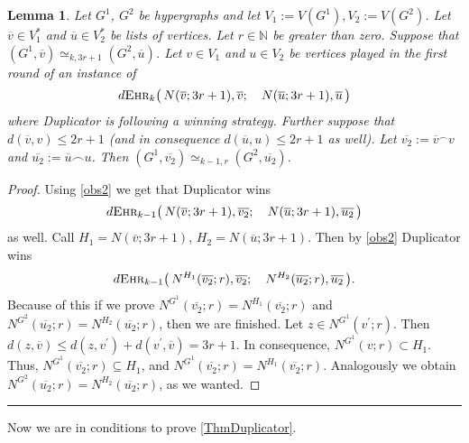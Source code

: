 \documentclass[12pt,notitlepage,a4paper]{article}
\newtheorem{lemma}{Lemma}[section]
\theoremstyle{definition}
\newcommand{\N}{\mathbb{N}}
\newcommand{\ehr}{\textsc{Ehr}}
\begin{document}
\begin{lemma} \label{lemm:Duplicator}
	Let $G^1$, $G^2$ be hypergraphs and let $V_1:=V(G^1),
	V_2:=V(G^2)$. Let $\overline{v}\in V_1^*$ and
	$\overline{u} \in V_2^*$ be lists of vertices. Let
	$r\in \N$ be greater than zero. Suppose that
	$(G^1,\overline{v})\simeq_{k,3r+1} (G^2,\overline{u})$.
	Let $v \in V_1$ and $u\in V_2$
	be vertices played in the first round of an instance of 
	\[
	d\ehr_k\big(\, N(\overline{v};3r+1),
	\overline{v}; \quad N(\overline{u};3r+1),\overline{u}\, \big)
	\]
	where Duplicator is following a winning strategy. Further suppose
	that $d(\overline{v},v)\leq 2r+1$ (and in consequence
	$d(\overline{u},u)\leq 2r+1$ as well). 
	Let $\overline{v_2}:=\overline{v}^\frown v$
	and $\overline{u_2}:=\overline{u}\frown u$.
	Then $(G^1,\overline{v_2})\simeq_{k-1,r}
	(G^2,\overline{u_2})$.
\end{lemma}

\begin{proof}
	Using \cref{obs2} we get that Duplicator wins 
	\[
	d\ehr_{k-1}\big(\, N(\overline{v};3r+1),
	\overline{v_2}; \quad N(\overline{u};3r+1)
	,\overline{u_2} \, \big)\]
	as well. Call $H_1=N(\overline{v};3r+1)$,
	$H_2=N(\overline{u};3r+1)$. Then by \cref{obs2}
	Duplicator wins
	\[
	d\ehr_{k-1}\big(\, N^{H_1}(
	\overline{v_2};r),\overline{v_2};\quad
	N^{H_2}(\overline{u_2};r),\overline{u_2}\, \big).
	\]
	Because of this if we prove $N^{G^1}(\overline{v_2};r)
	=N^{H_1}(\overline{v_2};r)$ and $N^{G^2}(\overline{u_2};r)
	=N^{H_2}(\overline{u_2};r)$, then we are finished. 
	Let $z\in N^{G^1}(v^\prime;r)$. Then
	$d(z,\overline{v})\leq d(z,v^\prime)+d(v^\prime,\overline{v})=3r+1$.
	In consequence, $N^{G^1}(v;r)\subset H_1$. Thus,
	$N^{G^1}(\overline{v_2};r)\subseteq H_1$, and $N^{G^1}(\overline{v_2};r)
	=N^{H_1}(\overline{v_2};r)$. Analogously we obtain 
	$N^{G^2}(\overline{u_2};r)=N^{H_2}(\overline{u_2};r)$, as we wanted. 
\end{proof}
\noindent\rule{2cm}{0.4pt}\par

Now we are in conditions to prove \cref{ThmDuplicator}.
\end{document}
